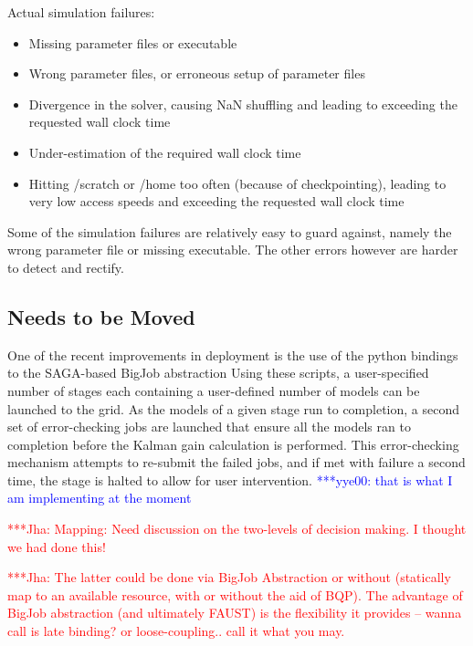 \documentclass[conference,final]{IEEEtran}
\newcommand{\jhanote}[1]{ {\textcolor{red} { ***Jha: #1 }}}
\newcommand{\yyenote}[1]{ {\textcolor{blue} { ***yye00: #1 }}}
\newcommand{\jhanote}[1]{}
\newcommand{\yyenote}[1]{}
\begin{document}
Actual simulation failures:
\begin{itemize}
\item{Missing parameter files or executable}
\item{Wrong parameter files, or erroneous setup of parameter files}
\item{Divergence in the solver, causing NaN shuffling and leading to exceeding the requested wall clock time}
\item{Under-estimation of the required wall clock time}
\item{Hitting /scratch or /home too often (because of checkpointing), leading to very low access speeds and exceeding the requested wall clock time}
\end{itemize}
Some of the simulation failures are relatively easy to guard against,
namely the wrong parameter file or missing executable. The other errors
however are harder to detect and rectify.

\subsection{Needs to be Moved}
One of the recent improvements in deployment is the use of the python
bindings to the SAGA-based BigJob abstraction %
Using these scripts, a user-specified number of stages each containing
a user-defined number of models can be launched to the grid. As the
models of a given stage run to completion, a second set of
error-checking jobs are launched that ensure all the models ran to
completion before the Kalman gain calculation is performed. This
error-checking mechanism attempts to re-submit the failed jobs, and if
met with failure a second time, the stage is halted to allow for user
intervention. \yyenote{that is what I am implementing at the moment}

\jhanote{Mapping: Need discussion on the two-levels of decision
  making. I thought we had done this!}

\jhanote{The latter could be done via BigJob Abstraction or without
  (statically map to an available resource, with or without the aid of
  BQP).  The advantage of BigJob abstraction (and ultimately FAUST) is
  the flexibility it provides -- wanna call is late binding? or
  loose-coupling..  call it what you may.}
\end{document}
